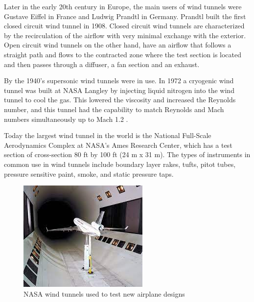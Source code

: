 Later in the early 20th century in Europe, the main users of wind tunnels were Gustave Eiffel in France and Ludwig Prandtl in Germany. Prandtl built the first closed circuit wind tunnel in 1908. Closed circuit wind tunnels are characterized by the recirculation of the airflow with very minimal exchange with the exterior. Open circuit wind tunnels on the other hand, have an airflow that follows a straight path and flows to the contracted zone where the test section is located and then passes through a diffuser, a fan section and an exhaust.

By the 1940’s supersonic wind tunnels were in use. In 1972 a cryogenic wind tunnel was built at NASA Langley by injecting liquid nitrogen into the wind tunnel to cool the gas. This lowered the viscosity and increased the Reynolds number, and this tunnel had the capability to match Reynolds and Mach numbers simultaneously up to Mach 1.2
\cite{fernandes_design_nodate}.

Today the largest wind tunnel in the world is the National Full-Scale Aerodynamics Complex at NASA's Ames Research Center, which has a test section of cross-section 80 ft by 100 ft (24 m x 31 m). The types of instruments in common use in wind tunnels include boundary layer rakes, tufts, pitot tubes, pressure sensitive paint, smoke, and static pressure taps.
\begin{center}
\begin{figure}[!h]
	\centering
	\includegraphics{Figures/Fig3}
	\caption{NASA wind tunnels used to test new airplane designs}
\end{figure}
\end{center}

